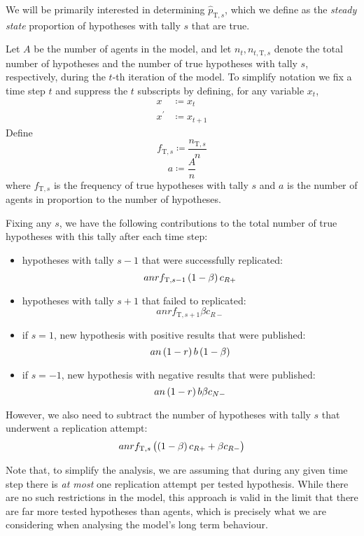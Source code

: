 \documentclass{article}
\newcommand{\tT}{\text{T}}
\begin{document}
We will be primarily interested in determining $\hat{p}_{\tT,s}$, which
we define as the \textit{steady state} proportion of hypotheses with
tally $s$ that are true.

Let $A$ be the number of agents in the model, and let
$n_t, n_{t, \tT, s}$ denote the total number of hypotheses and the
number of true hypotheses with tally $s$, respectively, during the
$t$-th iteration of the model. To simplify notation we fix a time step
$t$ and suppress the $t$ subscripts by defining, for any variable $x_t$,
%
\begin{align*}
    x &\coloneqq x_t \\
    x^\prime &\coloneqq x_{t + 1}
\end{align*}
%
Define $$f_{\tT, s} \coloneqq \frac{n_{\tT, s}}{n}$$ $$a \coloneqq \frac{A}{n}$$
where $f_{\tT, s}$ is the frequency of true hypotheses with tally $s$
and $a$ is the number of agents in proportion to the number of
hypotheses.

Fixing any $s$, we have the following contributions to the total number
of true hypotheses with this tally after each time step:

\begin{itemize}
    \item hypotheses with tally $s - 1$ that were successfully
        replicated:
        $$a n r f_{\tT, s - 1} \del{1 - \beta} c_{R +}$$
    \item hypotheses with tally $s + 1$ that failed to replicated:
        $$a n r f_{\tT, s + 1} \beta c_{R -}$$
    \item if $s = 1$, new hypothesis with positive results that were
        published:
        $$a n \del{1 - r} b \del{1 - \beta}$$
    \item if $s = -1$, new hypothesis with negative results that were
        published:
        $$a n \del{1 - r} b \beta c_{N -}$$
\end{itemize}

However, we also need to subtract the number of hypotheses with tally
$s$ that underwent a replication attempt:
$$a n r f_{\tT, s} \del{\del{1 - \beta} c_{R +} + \beta c_{R -}}$$

Note that, to simplify the analysis, we are assuming that during any
given time step there is \textit{at most} one replication attempt per
tested hypothesis. While there are no such restrictions in the model,
this approach is valid in the limit that there are far more tested
hypotheses than agents, which is precisely what we are considering when
analysing the model's long term behaviour.
\end{document}
